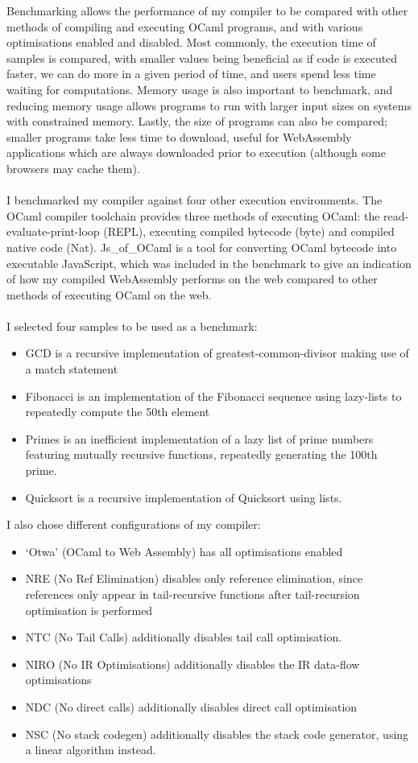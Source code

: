 \documentclass[12pt,twoside,notitlepage]{report}
\begin{document}
Benchmarking allows the performance of my compiler to be compared with other methods of compiling and executing OCaml programs, and with various optimisations enabled and disabled. Most commonly, the execution time of samples is compared, with smaller values being beneficial as if code is executed faster, we can do more in a given period of time, and users spend less time waiting for computations. Memory usage is also important to benchmark, and reducing memory usage allows programs to run with larger input sizes on systems with constrained memory. Lastly, the size of programs can also be compared; smaller programs take less time to download, useful for WebAssembly applications which are always downloaded prior to execution (although some browsers may cache them).
\\\\
I benchmarked my compiler against four other execution environments. The OCaml compiler toolchain provides three methods of executing OCaml: the read-evaluate-print-loop (REPL), executing compiled bytecode (byte) and compiled native code (Nat). Js\_of\_OCaml \cite{Js_of_ocaml} is a tool for converting OCaml bytecode into executable JavaScript, which was included in the benchmark to give an indication of how my compiled WebAssembly performs on the web compared to other methods of executing OCaml on the web.
\\\\
I selected four samples to be used as a benchmark:
\begin{itemize}
	\item GCD is a recursive implementation of greatest-common-divisor making use of a match statement
	\item Fibonacci is an implementation of the Fibonacci sequence using lazy-lists to repeatedly compute the 50th element
	\item Primes is an inefficient implementation of a lazy list of prime numbers featuring mutually recursive functions, repeatedly generating the 100th prime.
	\item Quicksort is a recursive implementation of Quicksort using lists.
\end{itemize}
I also chose different configurations of my compiler:
\begin{itemize}
	\item `Otwa' (OCaml to Web Assembly) has all optimisations enabled
	\item NRE (No Ref Elimination) disables only reference elimination, since references only appear in tail-recursive functions after tail-recursion optimisation is performed
	\item NTC (No Tail Calls) additionally disables tail call optimisation.
	\item NIRO (No IR Optimisations) additionally disables the IR data-flow optimisations
	\item NDC (No direct calls) additionally disables direct call optimisation
	\item NSC (No stack codegen) additionally disables the stack code generator, using a linear algorithm instead.
\end{itemize}
\end{document}
